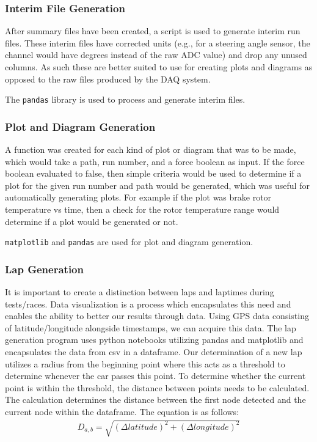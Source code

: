 \subsubsection{Interim File Generation}
After summary files have been created, a script is used to generate interim run files.
These interim files have corrected units (e.g., for a steering angle sensor, the channel would have degrees instead of the raw ADC value) and drop any unused columns.
As such these are better suited to use for creating plots and diagrams as opposed to the raw files produced by the DAQ system.
\vspace{1em}

The \texttt{pandas} library is used to process and generate interim files.
\subsubsection{Plot and Diagram Generation}
A function was created for each kind of plot or diagram that was to be made, which would take a path, run number, and a force boolean as input.
If the force boolean evaluated to false, then simple criteria would be used to determine if a plot for the given run number and path would be generated, which was useful for automatically generating plots.
For example if the plot was brake rotor temperature vs time, then a check for the rotor temperature range would determine if a plot would be generated or not.
\vspace{1em}

\texttt{matplotlib} and \texttt{pandas} are used for plot and diagram generation.

\subsubsection{Lap Generation}
It is important to create a distinction between laps and laptimes during tests/races. Data visualization is a process which encapsulates this need and enables the ability to better our results through data. Using GPS data consisting of latitude/longitude alongside timestamps, we can acquire this data.
The lap generation program uses python notebooks utilizing pandas and matplotlib and encapsulates the data from csv in a dataframe. Our determination of a new lap utilizes a radius from the beginning point where this acts as a threshold to determine whenever the car passes this point. To determine whether the current point is within the threshold, the distance between points needs to be calculated. The calculation determines the distance between the first node detected and the current node within the dataframe. The equation is as follows:
\begin{gather}
    D_{a,b} = \sqrt{(\Delta latitude)^2 + (\Delta longitude)^2} 
\end{gather}


